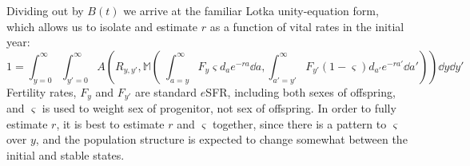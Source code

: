 Dividing out by $B(t)$ we arrive at the familiar Lotka unity-equation form,
which allows us to isolate and estimate $r$ as a function of vital rates in the
initial year:
\begin{equation}
\label{eq:ex2sexCRunity}
1 = \int_{y=0}^\infty \int_{y'=0}^\infty
A\left(R_{y,y'},\mathbb{M}\left(\;\int_{a=y}^\infty F_y \varsigma d_a
e^{-ra} \dd a, \int _{a'=y'}^\infty F_{y'} (1-\varsigma) d_{a'} e^{-ra'} \dd
a'\right)\right) \dd y
\dd y'
\end{equation} 
Fertility rates, $F_y$ and $F_{y'}$ are standard $e$SFR, including both sexes
of offspring, and $\varsigma$ is used to weight sex of
progenitor, not sex of offspring. In order to fully estimate $r$, it is best
to estimate $r$ and $\varsigma$ together, since there is a pattern to
$\varsigma$ over $y$, and the population structure is expected to change
somewhat between the initial and stable states. 

\FloatBarrier
